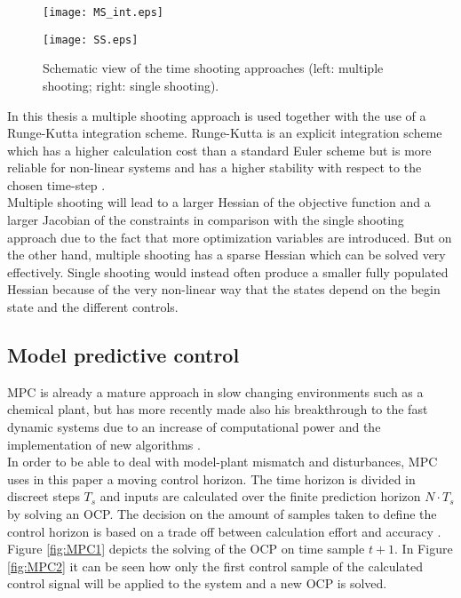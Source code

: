 \begin{figure}[htp]
	\centering
	\begin{minipage}{0.49\textwidth}
		\centering
		\texttt{[image: MS\_int.eps]}
	\end{minipage}
	\hfill
	\begin{minipage}{.49\textwidth}
		\centering
		\texttt{[image: SS.eps]}
	\end{minipage}
	\caption{Schematic view of the time shooting approaches (left: multiple shooting; right: single shooting).}
	\label{fig:TS}
\end{figure}

In this thesis a multiple shooting approach is used together with the use of a Runge-Kutta integration scheme. Runge-Kutta is an explicit integration scheme which has a higher calculation cost than a standard Euler scheme but is more reliable for non-linear systems and has a higher stability with respect to the chosen time-step \cite{Mercy2018}.  \\ 

Multiple shooting will lead to a larger Hessian of the objective function and a larger Jacobian of the constraints in comparison with the single shooting approach due to the fact that more optimization variables are introduced. But on the other hand, multiple shooting has a sparse Hessian which can be solved very effectively. Single shooting would instead often produce a smaller fully populated Hessian because of the very non-linear way that the states depend on the begin state and the different controls. 

\subsection{Model predictive control}
MPC is already a mature approach in slow changing environments such as a chemical plant, but has more recently made also his breakthrough to the fast dynamic systems due to an increase of computational power and the implementation of new algorithms \cite{Mercy2018}. \\

In order to be able to deal with model-plant mismatch and disturbances, MPC uses in this paper a moving control horizon. The time horizon is divided in discreet steps $T_{s}$ and inputs are calculated over the finite prediction horizon $N\cdot T_{s}$ by solving an OCP. The decision on the amount of samples taken to define the control horizon is based on a trade off between calculation effort and accuracy \cite{TongDuySon2019, Mercy2018}. Figure \ref{fig:MPC1} depicts the solving of the OCP on time sample $t+1$. In Figure \ref{fig:MPC2} it can be seen how only the first control sample of the calculated control signal will be applied to the system and a new OCP is solved. \\

